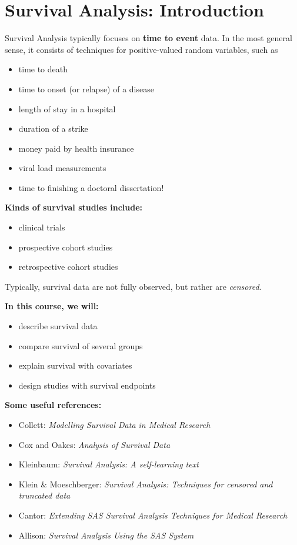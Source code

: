 \documentclass[11pt,slidesonly,semrot,portrait,palatino]{book}
\begin{document}
\setlength{\evensidemargin}{0in}
\setlength{\oddsidemargin}{.5in}
\setlength{\topmargin}{0in}
\setlength{\textwidth}{6in}
\setlength{\textheight}{9in}
\setcounter{page}{15} \setcounter{chapter}{1}
\chapter{Survival Analysis: Introduction}
Survival Analysis typically focuses on {\bf time to event} data.
In the most general sense, it consists of techniques for
positive-valued random variables, such as

\begin{itemize}
\item time to death
\item time to onset (or relapse) of a disease
\item length of stay in a hospital
\item duration of a strike
\item money paid by health insurance
\item viral load measurements
\item time to finishing a doctoral dissertation!
\end{itemize}
{\bf Kinds of survival studies include:}
    \begin{itemize}
    \item clinical trials
    \item prospective cohort studies
    \item retrospective cohort studies
    \end{itemize}
\newpage
\noindent Typically, survival data are not fully observed, but
rather are {\em censored}.\\[2ex]
{\bf In this course, we will:
\begin{itemize}
\item describe survival data
\item compare survival of several groups
\item explain survival with covariates
\item design studies with survival endpoints
\end{itemize}}
\noindent
{\bf Some useful references:}
\begin{itemize}
\item Collett: {\em Modelling Survival Data in Medical Research}
\item Cox and Oakes: {\em Analysis of Survival Data}
\item Kleinbaum: {\em Survival Analysis:  A self-learning text}
\item Klein \& Moeschberger: {\em Survival Analysis:  Techniques for
censored and truncated data}
\item Cantor: {\em Extending SAS Survival Analysis Techniques for
Medical Research}
\item Allison: {\em Survival Analysis Using the SAS System}
\end{itemize}
\end{document}

